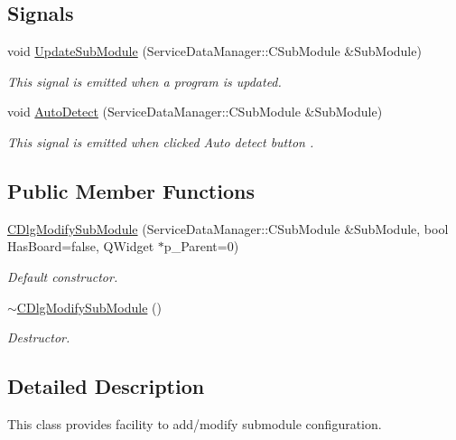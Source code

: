 \subsection*{\-Signals}
\begin{DoxyCompactItemize}
\item 
void \hyperlink{classSystemTracking_1_1CDlgModifySubModule_aab86d12463ce41f755693a70c56c3e5f}{\-Update\-Sub\-Module} (\-Service\-Data\-Manager\-::\-C\-Sub\-Module \&\-Sub\-Module)
\begin{DoxyCompactList}\small\item\em \-This signal is emitted when a program is updated. \end{DoxyCompactList}\item 
void \hyperlink{classSystemTracking_1_1CDlgModifySubModule_a383d189727bf33431fe6891467577215}{\-Auto\-Detect} (\-Service\-Data\-Manager\-::\-C\-Sub\-Module \&\-Sub\-Module)
\begin{DoxyCompactList}\small\item\em \-This signal is emitted when clicked \-Auto detect button . \end{DoxyCompactList}\end{DoxyCompactItemize}
\subsection*{\-Public \-Member \-Functions}
\begin{DoxyCompactItemize}
\item 
\hyperlink{classSystemTracking_1_1CDlgModifySubModule_ad4fe1cd27b392b4a1a8f0f18f2a7287b}{\-C\-Dlg\-Modify\-Sub\-Module} (\-Service\-Data\-Manager\-::\-C\-Sub\-Module \&\-Sub\-Module, bool \-Has\-Board=false, \-Q\-Widget $\ast$p\-\_\-\-Parent=0)
\begin{DoxyCompactList}\small\item\em \-Default constructor. \end{DoxyCompactList}\item 
\hyperlink{classSystemTracking_1_1CDlgModifySubModule_ae22f9e9ce31e80230316e5f7e72dff2b}{$\sim$\-C\-Dlg\-Modify\-Sub\-Module} ()
\begin{DoxyCompactList}\small\item\em \-Destructor. \end{DoxyCompactList}\end{DoxyCompactItemize}


\subsection{\-Detailed \-Description}
\-This class provides facility to add/modify submodule configuration. 

